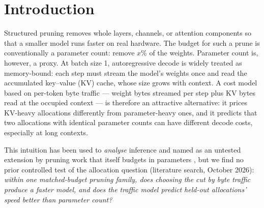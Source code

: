 \documentclass[10pt,letterpaper,twocolumn]{article}
\begin{document}
\section{Introduction}
Structured pruning removes whole layers, channels, or attention
components so that a smaller model runs faster on real hardware.
The budget for such a prune is conventionally a parameter count:
remove $x$\% of the weights. Parameter count is, however, a proxy.
At batch size 1, autoregressive decode is widely treated as
memory-bound: each step must stream the model's weights once and
read the accumulated key--value (KV) cache, whose size grows with
context. A cost model based on per-token byte traffic --- weight
bytes streamed per step plus KV bytes read at the occupied context
--- is therefore an attractive alternative: it prices KV-heavy
allocations differently from parameter-heavy ones, and it predicts
that two allocations with identical parameter counts can have
different decode costs, especially at long contexts.

This intuition has been used to \emph{analyse} inference
\citep{rooflinebench2026} and named as an untested extension by
pruning work that itself budgets in parameters
\citep{grasprune2026}, but we find no prior controlled test of the
allocation question (literature search, October 2026):
\emph{within one matched-budget pruning
family, does choosing the cut by byte traffic produce a faster
model, and does the traffic model predict held-out allocations'
speed better than parameter count?}
\end{document}
